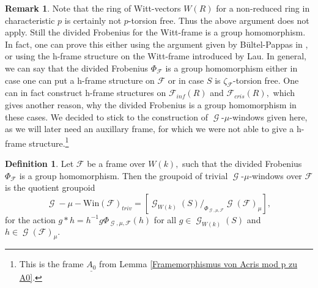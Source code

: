 \documentclass[a4paper,10,5 pt]{amsart}
\theoremstyle{definition}
\newtheorem{Definition}{Definition}
\newtheorem{Remark}{Remark}
\DeclareMathOperator{\G}{\mathcal{G}}
\begin{document}
\begin{Remark}
Note that the ring of Witt-vectors $W(R)$ for a non-reduced ring in characteristic $p$  is  certainly not $p$-torsion free. Thus the above argument does not apply. Still the divided Frobenius for the Witt-frame is a group homomorphism. In fact, one can prove this either using the argument given by Bültel-Pappas in \cite[Prop. 3.1.2.]{BP}, or using the h-frame structure on the Witt-frame introduced by Lau. In general, we can say that the divided Frobenius $\Phi_{\mathcal{F}}$ is a group homomorphism either in case one can put a h-frame structure on $\mathcal{F}$ or in case $S$ is $\zeta_{\mathcal{F}}$-torsion free. One can in fact construct h-frame structures on $\mathcal{F}_{inf}(R)$ and $\mathcal{F}_{cris}(R),$ which gives another reason, why the divided Frobenius is a group homomorphism in these cases. We decided to stick to the construction of $\G$-$\mu$-windows given here, as we will later need an auxillary frame, for which we were not able to give a h-frame structure.\footnote{This is the frame $\underline{A_{0}}$ from Lemma \ref{Framemorphismus von Acris mod p zu A0}.}
\end{Remark}
\begin{Definition}
Let $\mathcal{F}$ be a frame over $W(k),$ such that the divided Frobenius $\Phi_{\mathcal{F}}$ is a group homomorphism. Then the groupoid of trivial $\G$-$\mu$-windows over $\mathcal{F}$ is the quotient groupoid
$$
\G-\mu-\text{Win}(\mathcal{F})_{triv}=[\G_{W(k)}(S)/_{\Phi_{\G,\mu,\mathcal{F}}} \G(\mathcal{F})_{\mu}],
$$ 
for the action $g\ast h=h^{-1}g\Phi_{\G,\mu,\mathcal{F}}(h)$ for all $g\in \G_{W(k)}(S)$ and $h\in \G(\mathcal{F})_{\mu}.$
\end{Definition}
\end{document}
